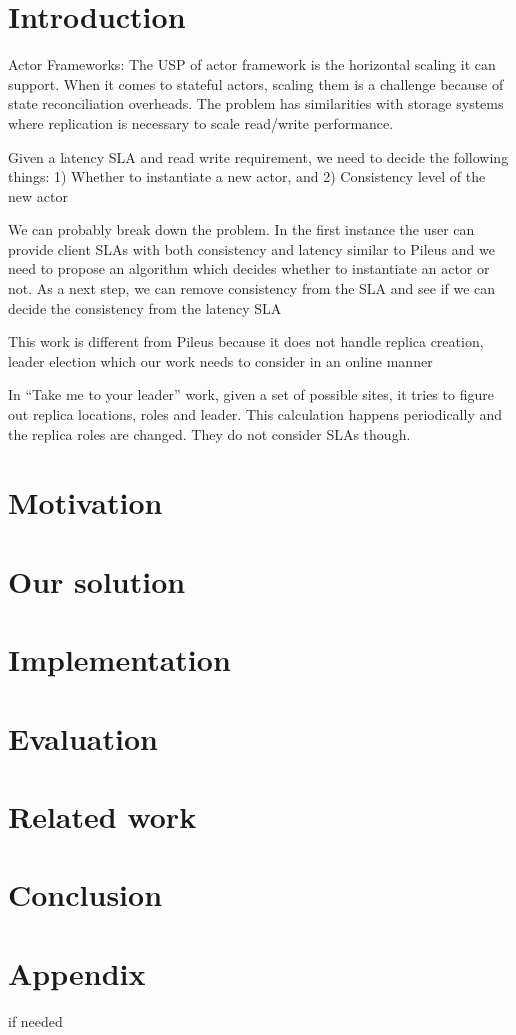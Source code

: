 \section{Introduction}
\label{sec:intro}

Actor Frameworks: The USP of actor framework is the horizontal scaling it can support. When it comes to stateful actors, scaling them is a challenge because of state reconciliation overheads. The problem has similarities with storage systems where replication is necessary to scale read/write performance. 

Given a latency SLA and read write requirement, we need to decide the following things: 1) Whether to instantiate a new actor, and 2) Consistency level of the new actor

We can probably break down the problem. In the first instance the user can provide client SLAs with both consistency and latency similar to Pileus and we need to propose an algorithm which decides whether to instantiate an actor or not. As a next step, we can remove consistency from the SLA and see if we can decide the consistency from the latency SLA

This work is different from Pileus because it does not handle replica creation, leader election which our work needs to consider in an online manner

In ``Take me to your leader'' work, given a set of possible sites, it tries to figure out replica locations, roles and leader. This calculation happens periodically and the replica roles are changed. They do not consider SLAs though.

\section{Motivation}


\section{Our solution}


\section{Implementation}  

  
\section{Evaluation}


\section{Related work}


\section{Conclusion}

  
\section*{Appendix}


if needed